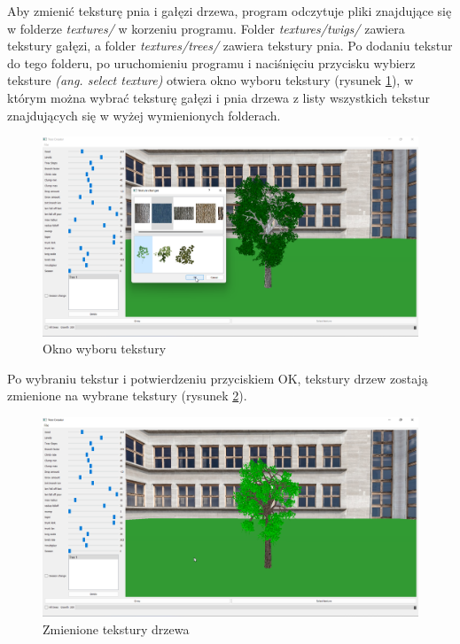 \documentclass[a4paper,twoside,12pt]{report}
\begin{document}
Aby zmienić teksturę pnia i gałęzi drzewa, program odczytuje pliki 
znajdujące się w folderze \textit{textures/} w korzeniu programu. 
Folder \textit{textures/twigs/} zawiera tekstury gałęzi, 
a folder \textit{textures/trees/} zawiera tekstury pnia.
Po dodaniu tekstur do tego folderu, po uruchomieniu programu i 
naciśnięciu przycisku wybierz teksture \textit{(ang. select texture)} 
otwiera okno wyboru tekstury (rysunek \ref{fig:texchoosewin}), w którym 
można wybrać teksturę gałęzi i pnia drzewa z listy wszystkich tekstur 
znajdujących się w wyżej wymienionych folderach.

\begin{figure}[ht]
	\centering\includegraphics[width=12cm]{grafika/program/texture2.png}
	\caption{Okno wyboru tekstury}
    \label{fig:texchoosewin}
\end{figure}

Po wybraniu tekstur i potwierdzeniu przyciskiem OK, 
tekstury drzew zostają zmienione na wybrane 
tekstury (rysunek \ref{fig:texchoosewin2}).

\begin{figure}[H]
	\centering\includegraphics[width=12cm]{grafika/program/texture3.png}
	\caption{Zmienione tekstury drzewa}
    \label{fig:texchoosewin2}
\end{figure}
\end{document}
